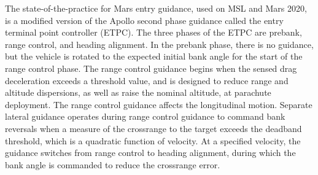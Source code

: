 \documentclass[journal ]{new-aiaa}
\begin{document}
The state-of-the-practice for Mars entry guidance, used on MSL and Mars 2020, is a modified version of the Apollo second phase guidance \cite{MSL_EDL2} called the entry terminal point controller (ETPC). 
The three phases of the ETPC are prebank, range control, and heading alignment. In the prebank phase, there is no guidance, but the vehicle is rotated to the expected initial bank angle for the start of the range control phase.
The range control guidance begins when the sensed drag deceleration exceeds a threshold value, and 
is designed to reduce range and altitude dispersions, as well as raise the nominal altitude, at parachute deployment. The range control guidance affects the longitudinal motion. Separate lateral guidance operates during range control guidance to command bank reversals when a measure of the crossrange to the target exceeds the deadband threshold, which is a quadratic function of velocity. At a specified velocity, the guidance switches from range control to heading alignment, during which the bank angle is commanded to reduce the crossrange error.
\end{document}
